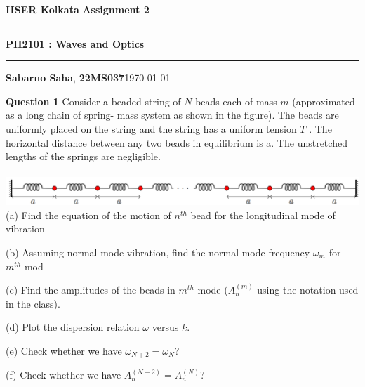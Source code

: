 \documentclass[addpoints]{exam}
\begin{document}
\par\textbf{IISER Kolkata} \hfill \textbf{Assignment 2}
\vspace{3pt}
\hrule
\vspace{3pt}
\begin{center}
        \LARGE{\textbf{PH2101 : Waves and Optics}}
\end{center}
\vspace{3pt}
\hrule
\vspace{4pt}
\textbf{Sabarno Saha}, \textbf{22MS037}\hfill \today
\vspace{20pt}
\bigskip
\begin{questions}
\question 
\textbf{Question 1}
Consider a beaded string of $N$ beads each of mass $m$ (approximated as a long chain of spring-
mass system as shown in the figure). The beads are uniformly placed on the string and the
string has a uniform tension $T$ . The horizontal distance between any two beads in equilibrium
is a. The unstretched lengths of the springs are negligible.\\ \\ 
\includegraphics[width = 6.0in]{q1.png}\\ 
(a) Find the equation of the motion of $n^{th}$ bead for the longitudinal mode of vibration
\begin{solution}
 
\end{solution}
(b) Assuming normal mode vibration, find the normal mode frequency $\omega_m$ for $m^{th}$ mod
\begin{solution}
 
\end{solution}
(c) Find the amplitudes of the beads in $m^{th}$ mode ($A^{(m)}_n$ using the notation used in the class).
\begin{solution}
 
\end{solution}
(d) Plot the dispersion relation $\omega$ versus $k$.
\begin{solution}
 
\end{solution}
(e) Check whether we have $\omega_{N+2} = \omega_N$?
\begin{solution}
 
\end{solution}
(f) Check whether we have $A^{(N +2)}_n = A^{(N)}_n$?
\begin{solution}
 

\end{solution}
\end{questions}
\end{document}

